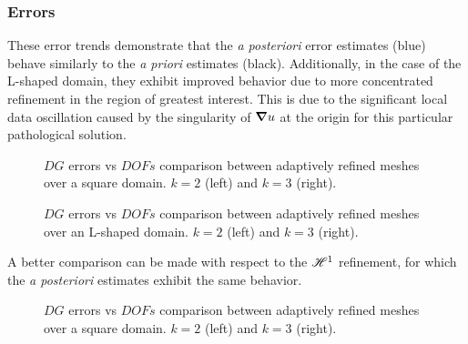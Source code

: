 \newpage
\subsubsection{Errors}

These error trends demonstrate that the \textit{a posteriori} error estimates (blue) behave similarly to the \textit{a priori} estimates (black). Additionally, in the case of the L-shaped domain, they exhibit improved behavior due to more concentrated refinement in the region of greatest interest. This is due to the significant local data oscillation caused by the singularity of $\bm{\nabla} u$ at the origin for this particular pathological solution.

\begin{figure}[!ht]
	\begin{subfigure}[b]{0.45\textwidth}
		
	\end{subfigure}
	\hfill
	\begin{subfigure}[b]{0.45\textwidth}
		
	\end{subfigure}
    \caption{$DG$ errors vs $DOFs$ comparison between adaptively refined meshes over a square domain. $k = 2$ (left) and $k = 3$ (right).}
\end{figure}

\begin{figure}[!ht]
	\begin{subfigure}[b]{0.45\textwidth}
		
	\end{subfigure}
	\hfill
	\begin{subfigure}[b]{0.45\textwidth}
	\end{subfigure}
    \caption{$DG$ errors vs $DOFs$ comparison between adaptively refined meshes over an L-shaped domain. $k = 2$ (left) and $k = 3$ (right).}
\end{figure}

\newpage

A better comparison can be made with respect to the $\mathscr{H}^1$ refinement, for which the \textit{a posteriori} estimates exhibit the same behavior.

\begin{figure}[!ht]
	\begin{subfigure}[b]{0.45\textwidth}
		
	\end{subfigure}
	\hfill
	\begin{subfigure}[b]{0.45\textwidth}
		
	\end{subfigure}
    \caption{$DG$ errors vs $DOFs$ comparison between adaptively refined meshes over a square domain. $k = 2$ (left) and $k = 3$ (right).}
\end{figure}

